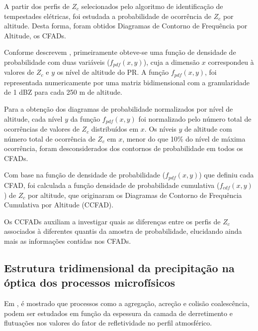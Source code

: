 A partir dos perfis de $Z_c$ selecionados pelo algoritmo de identificação de tempestades elétricas, foi estudada a probabilidade de ocorrência de $Z_c$ por altitude. Desta forma, foram obtidos Diagramas de Contorno de Frequência por Altitude, os CFADs.

Conforme descrevem , primeiramente obteve-se uma função de densidade de probabilidade com duas variáveis ($f_{pdf}(x,y)$), cuja a dimensão $x$ correspondeu à valores de $Z_{c}$ e $y$ os nível de altitude do PR. A função $f_{pdf}(x,y)$, foi representada numericamente por uma matriz bidimensional com a granularidade de 1 dBZ para cada 250 m de altitude.



Para a obtenção dos diagramas de probabilidade normalizados por nível de altitude, cada nível $y$ da função $f_{pdf}(x,y)$ foi normalizado pelo número total de ocorrências de valores de $Z_c$ distribuídos em $x$. Os níveis $y$ de altitude com número total de ocorrência de $Z_c$ em $x$, menor do que 10\% do nível de máxima ocorrência, foram desconsiderados dos contornos de probabilidade em todos os CFADs.


Com base na função de densidade de probabilidade ($f_{pdf}(x,y)$) que definiu cada CFAD, foi calculada a função densidade de probabilidade cumulativa ($f_{cdf}(x,y)$) de $Z_c$ por altitude, que originaram os Diagramas de Contorno de Frequência Cumulativa por Altitude (CCFAD).     



Os CCFADs auxiliam a investigar quais as diferenças entre os perfis de $Z_c$ associados à diferentes quantis da amostra de probabilidade, elucidando ainda mais as informações contidas nos CFADs.


\subsection{Estrutura tridimensional da precipitação na óptica dos processos microfísicos}


Em , é mostrado que processos como a agregação, acreção e colisão coalescência, podem ser estudados em função da espessura da camada de derretimento e flutuações nos valores do fator de refletividade no perfil atmosférico. 

